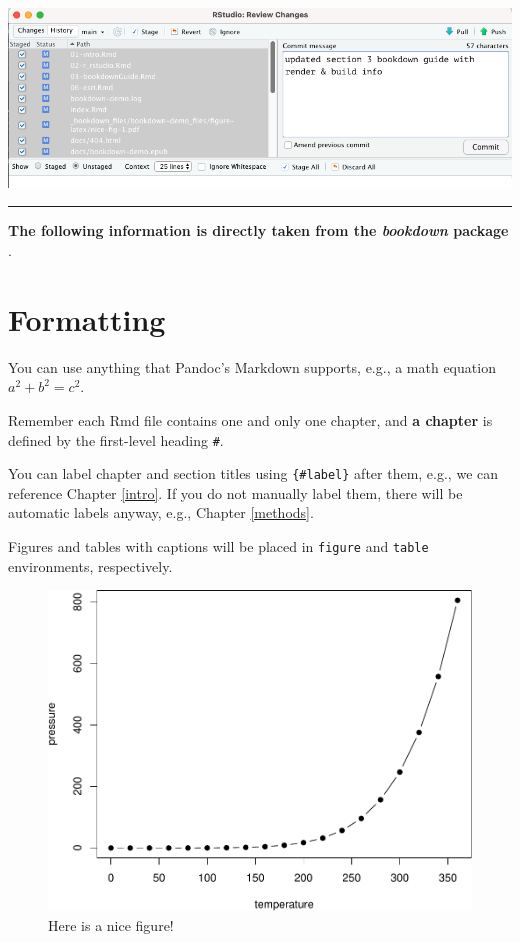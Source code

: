 \documentclass[
]{book}
\begin{document}
\begin{center}\includegraphics[width=12.03in]{images/commit} \end{center}

\begin{center}\rule{0.5\linewidth}{0.5pt}\end{center}

\textbf{The following information is directly taken from the \emph{bookdown} package} \citep{R-bookdown}.

\hypertarget{formatting}{%
\section{Formatting}\label{formatting}}

You can use anything that Pandoc's Markdown supports, e.g., a math equation \(a^2 + b^2 = c^2\).

Remember each Rmd file contains one and only one chapter, and \textbf{a chapter} is defined by the first-level heading \texttt{\#}.

You can label chapter and section titles using \texttt{\{\#label\}} after them, e.g., we can reference Chapter \ref{intro}. If you do not manually label them, there will be automatic labels anyway, e.g., Chapter \ref{methods}.

Figures and tables with captions will be placed in \texttt{figure} and \texttt{table} environments, respectively.

\begin{figure}

{\centering \includegraphics[width=0.8\linewidth]{bookdown-demo_files/figure-latex/nice-fig-1} 

}

\caption{Here is a nice figure!}\label{fig:nice-fig}
\end{figure}
\end{document}
